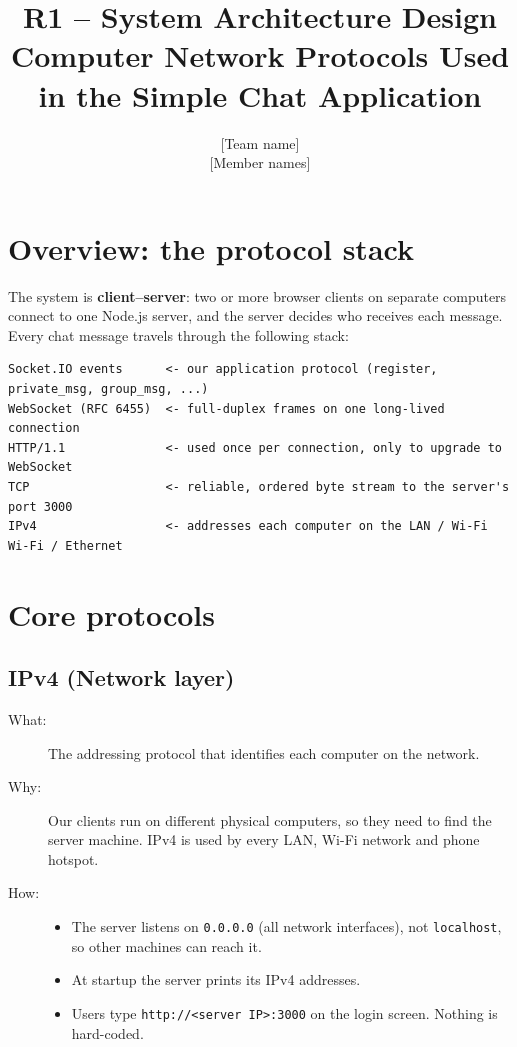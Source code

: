 \documentclass[11pt,a4paper]{article}
\title{\textbf{R1 -- System Architecture Design}\\[2pt]
\large Computer Network Protocols Used in the Simple Chat Application}
\author{{[Team name]} \\ {[Member names]}}
\date{}
\newcommand{\code}[1]{\texttt{#1}}
\begin{document}
\maketitle

\section{Overview: the protocol stack}

The system is \textbf{client--server}: two or more browser clients on separate
computers connect to one Node.js server, and the server decides who receives
each message. Every chat message travels through the following stack:

\begin{lstlisting}
Socket.IO events      <- our application protocol (register, private_msg, group_msg, ...)
WebSocket (RFC 6455)  <- full-duplex frames on one long-lived connection
HTTP/1.1              <- used once per connection, only to upgrade to WebSocket
TCP                   <- reliable, ordered byte stream to the server's port 3000
IPv4                  <- addresses each computer on the LAN / Wi-Fi
Wi-Fi / Ethernet
\end{lstlisting}

\section{Core protocols}

\subsection{IPv4 (Network layer)}
\begin{description}
  \item[What:] The addressing protocol that identifies each computer on the network.
  \item[Why:] Our clients run on different physical computers, so they need to
    find the server machine. IPv4 is used by every LAN, Wi-Fi network and phone hotspot.
  \item[How:]
    \begin{itemize}
      \item The server listens on \code{0.0.0.0} (all network interfaces), not
        \code{localhost}, so other machines can reach it.
      \item At startup the server prints its IPv4 addresses.
      \item Users type \code{http://<server IP>:3000} on the login screen. Nothing is hard-coded.
    \end{itemize}
\end{description}
\end{document}
